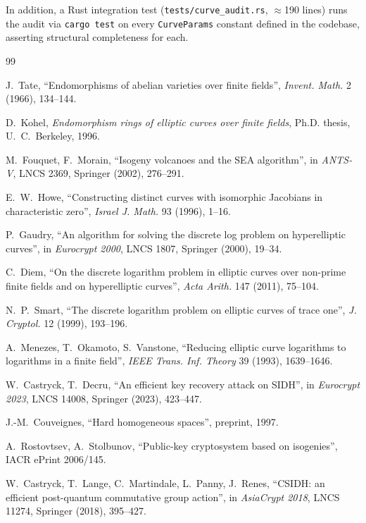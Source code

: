 \documentclass[11pt,a4paper]{article}
\theoremstyle{definition}
\begin{document}
In addition, a Rust integration test
(\texttt{tests/curve\_audit.rs}, $\approx$190 lines) runs the audit
via \texttt{cargo test} on every \texttt{CurveParams} constant
defined in the codebase, asserting structural completeness for each.

\begin{thebibliography}{99}

 J.~Tate, ``Endomorphisms of abelian varieties
over finite fields'', \emph{Invent. Math.} 2 (1966), 134--144.

 D.~Kohel, \emph{Endomorphism rings of elliptic
curves over finite fields}, Ph.D. thesis, U.~C.~Berkeley, 1996.

 M.~Fouquet, F.~Morain, ``Isogeny
volcanoes and the SEA algorithm'', in \emph{ANTS-V}, LNCS 2369,
Springer (2002), 276--291.

 E.~W.~Howe, ``Constructing distinct curves with
isomorphic Jacobians in characteristic zero'', \emph{Israel J. Math.}
93 (1996), 1--16.

 P.~Gaudry, ``An algorithm for solving the
discrete log problem on hyperelliptic curves'', in \emph{Eurocrypt
2000}, LNCS 1807, Springer (2000), 19--34.

 C.~Diem, ``On the discrete logarithm problem in
elliptic curves over non-prime finite fields and on hyperelliptic
curves'', \emph{Acta Arith.} 147 (2011), 75--104.

 N.~P.~Smart, ``The discrete logarithm problem
on elliptic curves of trace one'', \emph{J. Cryptol.} 12 (1999),
193--196.

 A.~Menezes, T.~Okamoto, S.~Vanstone, ``Reducing
elliptic curve logarithms to logarithms in a finite field'',
\emph{IEEE Trans. Inf. Theory} 39 (1993), 1639--1646.

 W.~Castryck, T.~Decru, ``An efficient
key recovery attack on SIDH'', in \emph{Eurocrypt 2023}, LNCS
14008, Springer (2023), 423--447.

 J.-M.~Couveignes, ``Hard homogeneous
spaces'', preprint, 1997.

 A.~Rostovtsev, A.~Stolbunov,
``Public-key cryptosystem based on isogenies'', IACR ePrint
2006/145.

 W.~Castryck, T.~Lange, C.~Martindale, L.~Panny,
J.~Renes, ``CSIDH: an efficient post-quantum commutative group
action'', in \emph{AsiaCrypt 2018}, LNCS 11274, Springer (2018),
395--427.


\end{thebibliography}
\end{document}
